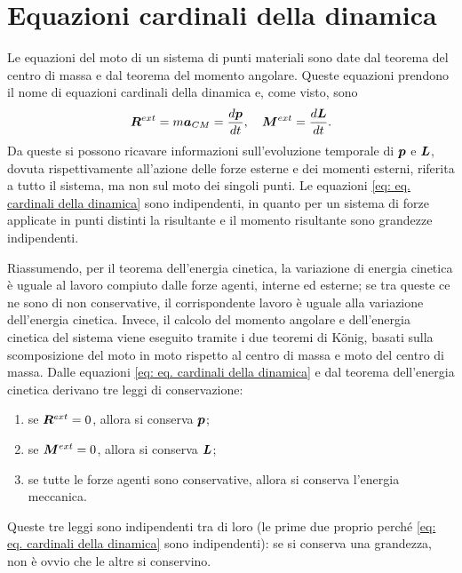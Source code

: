 \section{Equazioni cardinali della dinamica}
Le equazioni del moto di un sistema di punti materiali sono date dal teorema del centro di massa e dal teorema del momento angolare. Queste equazioni prendono il nome di equazioni cardinali della dinamica e, come visto, sono 
\begin{equation}
\label{eq: eq. cardinali della dinamica}
    \bm{R}^{ext}=m\bm{a}_{CM}=\frac{d\bm{p}}{dt},\quad\bm{M}^{ext}=\frac{d\bm{L}}{dt}.
\end{equation}
Da queste si possono ricavare informazioni sull'evoluzione temporale di $\bm{p}$ e $\bm{L}$, dovuta rispettivamente all'azione delle forze esterne e dei momenti esterni, riferita a tutto il sistema, ma non sul moto dei singoli punti. Le equazioni \eqref{eq: eq. cardinali della dinamica} sono indipendenti, in quanto per un sistema di forze applicate in punti distinti la risultante e il momento risultante sono grandezze indipendenti. 

Riassumendo, per il teorema dell'energia cinetica, la variazione di energia cinetica è uguale al lavoro compiuto dalle forze agenti, interne ed esterne; se tra queste ce ne sono di non conservative, il corrispondente lavoro è uguale alla variazione dell'energia cinetica. Invece, il calcolo del momento angolare e dell'energia cinetica del sistema viene eseguito tramite i due teoremi di K\"onig, basati sulla scomposizione del moto in moto rispetto al centro di massa e moto del centro di massa. Dalle equazioni \eqref{eq: eq. cardinali della dinamica} e dal teorema dell'energia cinetica derivano tre leggi di conservazione:
\begin{enumerate}
    \item se $\bm{R}^{ext}=0$, allora si conserva $\bm{p}$;
    \item se $\bm{M}^{ext}=0$, allora si conserva $\bm{L}$;
    \item se tutte le forze agenti sono conservative, allora si conserva l'energia meccanica.
\end{enumerate}
Queste tre leggi sono indipendenti tra di loro (le prime due proprio perché \eqref{eq: eq. cardinali della dinamica} sono indipendenti): se si conserva una grandezza, non è ovvio che le altre si conservino.